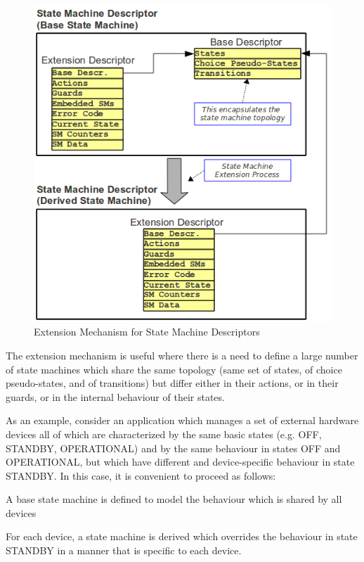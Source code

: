 \documentclass[a4paper,10pt]{article}
\newenvironment{fw_itemize}						%
{\begin{itemize}
  \setlength{\itemsep}{1mm}
  \setlength{\parskip}{0pt}
  \setlength{\parsep}{0pt}}
{\end{itemize}}
\begin{document}
\begin{figure}[ht]
 \centering
 \includegraphics[scale=0.52,keepaspectratio=true]{../images/SMDExtension.png}
 \caption{Extension Mechanism for State Machine Descriptors}
 \label{fig:SMDExtension}
\end{figure}

The extension mechanism is useful where there is a need to define a large number of state machines which share 
the same topology (same set of states, of choice pseudo-states, and of transitions) but differ either in their 
actions, or in their guards, or in the internal behaviour of their states.

As an example, consider an application which manages a set of external hardware devices all of which are 
characterized by the same basic states (e.g. OFF, STANDBY, OPERATIONAL) and by the same behaviour in states OFF 
and OPERATIONAL, but which have different and device-specific behaviour in state STANDBY. In this case, it is 
convenient to proceed as follows:

\begin{fw_itemize}
\item A base state machine is defined to model the behaviour which is shared by all devices
\item For each device, a state machine is derived which overrides the behaviour in state STANDBY in a manner 
that is specific to each device.
\end{fw_itemize}
\end{document}
